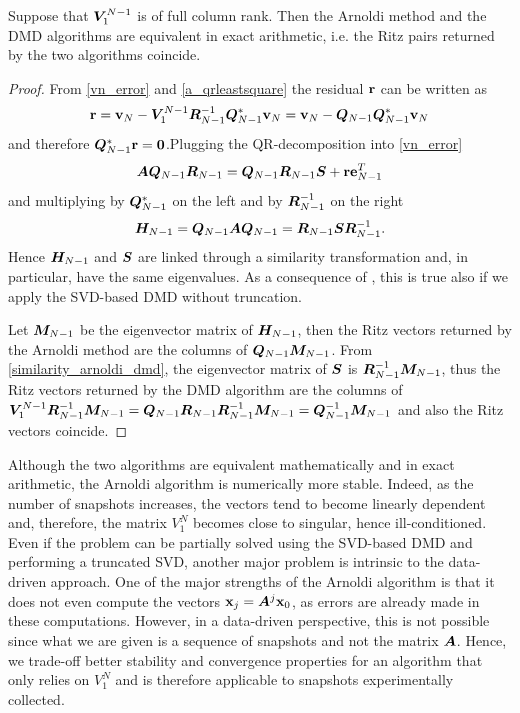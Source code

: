 \begin{prop}
Suppose that $\vb*{V}_1^{N-1}$ is of full column rank. Then the Arnoldi method and the DMD algorithms are equivalent in exact arithmetic, i.e. the Ritz pairs returned by the two algorithms coincide. 
\end{prop}
\begin{proof}
From \eqref{vn_error} and \eqref{a_qrleastsquare} the residual $\vb{r}$ can be written as
\begin{equation*}
    \vb{r} = \vb{v}_N - \vb*{V}_1^{N-1}\vb*{R}_{N-1}^{-1}\vb*{Q}_{N-1}^*\vb{v}_N = \vb{v}_N - \vb*{Q}_{N-1}\vb*{Q}_{N-1}^*\vb{v}_N
\end{equation*}
and therefore $\vb*{Q}_{N-1}^*\vb{r} = \vb*{0}$.Plugging the QR-decomposition into \eqref{vn_error}
\begin{equation*}
    \vb*{A}\vb*{Q}_{N-1}\vb*{R}_{N-1} = \vb*{Q}_{N-1}\vb*{R}_{N-1}\vb*{S} + \vb{r}\vb{e}_{N-1}^T
\end{equation*}
and multiplying by $\vb*{Q}_{N-1}^*$ on the left and by $\vb*{R}_{N-1}^{-1}$ on the right
\begin{equation}
    \label{similarity_arnoldi_dmd}
    \vb*{H}_{N-1} = \vb*{Q}_{N-1}\vb*{A}\vb*{Q}_{N-1} = \vb*{R}_{N-1}\vb*{S}\vb*{R}_{N-1}^{-1}.
\end{equation}
Hence $\vb*{H}_{N-1}$ and $\vb*{S}$ are linked through a similarity transformation and, in particular, have the same eigenvalues. As a consequence of , this is true also if we apply the SVD-based DMD without truncation.

Let $\vb*{M}_{N-1}$ be the eigenvector matrix of $\vb*{H}_{N-1}$, then the Ritz vectors returned by the Arnoldi method are the columns of $\vb*{Q}_{N-1}\vb*{M}_{N-1}$. From \eqref{similarity_arnoldi_dmd}, the eigenvector matrix of $\vb*{S}$ is $\vb*{R}_{N-1}^{-1}\vb*{M}_{N-1}$, thus the Ritz vectors returned by the DMD algorithm are the columns of $\vb*{V}_1^{N-1}\vb*{R}_{N-1}^{-1}\vb*{M}_{N-1} = \vb*{Q}_{N-1}\vb*{R}_{N-1}\vb*{R}_{N-1}^{-1}\vb*{M}_{N-1} = \vb*{Q}_{N-1}^{-1}\vb*{M}_{N-1}$ and also the Ritz vectors coincide.
\end{proof}


Although the two algorithms are equivalent mathematically and in exact arithmetic, the Arnoldi algorithm is numerically more stable. Indeed, as the number of snapshots increases, the vectors tend to become linearly dependent and, therefore, the matrix $V_1^N$ becomes close to singular, hence ill-conditioned. Even if the problem can be partially solved using the SVD-based DMD and performing a truncated SVD, another major problem is intrinsic to the data-driven approach. One of the major strengths of the Arnoldi algorithm is that it does not even compute the vectors $\vb{x}_j = \vb*{A}^j \vb{x}_0$, as errors are already made in these computations. However, in a data-driven perspective, this is not possible since what we are given is a sequence of snapshots and not the matrix $\vb*{A}$. Hence, we trade-off better stability and convergence properties for an algorithm that only relies on $V_1^N$ and is therefore applicable to snapshots experimentally collected.

